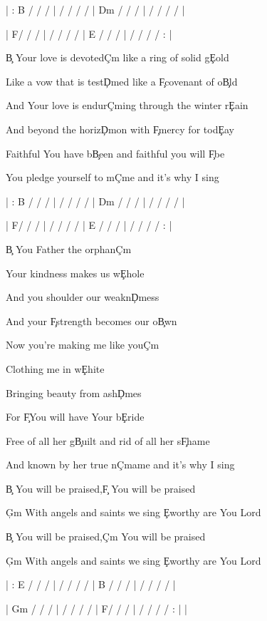\documentclass[9pt]{extarticle}
\begin{document}
\bsong

\bi
| : B / / /  |  / / / /  |  D\s m / / /  |  / / / /  |

|  F\s  / / /  |  / / / /  |  E / / /  |  / / / / : |
\ei

\bv
\c{B} Your love is devoted\c{C\s m} like a ring of solid g\c{E}old

Like a vow that is test\c{D\s m}ed like a \c{F\s }covenant of o\c{B}ld

And Your love is endur\c{C\s m}ing through the winter r\c{E}ain

And beyond the horiz\c{D\s m}on with \c{F\s }mercy for tod\c{E}ay
\ev

\bp
Faithful You have b\c{B}een and faithful you will \c{F\s }be

You pledge yourself to m\c{C\s m}e and it's why I sing
\ep

\bc
{}



\ec

\bin
| : B / / /  |  / / / /  |  D\s m / / /  |  / / / /  |

|  F\s  / / /  |  / / / /  |  E / / /  |  / / / / : |
\ein

\bv
\c{B} You Father the orphan\c{C\s m}

Your kindness makes us w\c{E}hole

And you shoulder our weakn\c{D\s m}ess

And your \c{F\s }strength becomes our o\c{B}wn

Now you're making me like you\c{C\s m}

Clothing me in w\c{E}hite

Bringing beauty from ash\c{D\s m}es

For \c{F\s }You will have Your b\c{E}ride
\ev

\bp
Free of all her g\c{B}uilt and rid of all her s\c{F\s }hame

And known by her true n\c{C\s m}ame and it's why I sing
\ep


\bb[2]
\c{B} You will be praised,\c{F\s } You will be praised

\c{G\s m} With angels and saints we sing \c{E}worthy are You Lord

\c{B} You will be praised,\c{C\s m} You will be praised

\c{G\s m} With angels and saints we sing \c{E}worthy are You Lord
\eb


\bo
| : E / / /  |  / / / /  |  B / / /  |  / / / /  |

|  G\s m / / /  |  / / / /  |  F\s  / / /  |  / / / / : |  |
\eo

\esong
\end{document}
